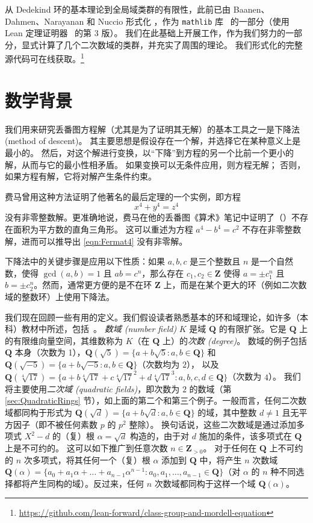\documentclass[sigplan,10pt,nonacm,
screen]{acmart} \settopmatter{printfolios=true,printccs=false,printacmref=false}
\newcommand{\mathlib}{\lstinline{mathlib}\xspace}
\newcommand{\QQ}{\mathbf{Q}}
\newcommand{\ZZ}{\mathbf{Z}}
\begin{document}
从 Dedekind 环的基本理论到全局域类群的有限性，此前已由 Baanen、Dahmen、Narayanan 和 Nuccio 形式化 \cite{baanen_formalization_2021}，作为 \mathlib 库~\cite{mathlib} 的一部分（使用 Lean 定理证明器~\cite{lean-prover} 的第 3 版）。
我们在此基础上开展工作，作为我们努力的一部分，显式计算了几个二次数域的类群，并充实了周围的理论。
我们形式化的完整源代码可在线获取。\footnote{\url{https://github.com/lean-forward/class-group-and-mordell-equation}}

\section{数学背景}\label{sec:Background}

我们用来研究丢番图方程解（尤其是为了证明其无解）的基本工具之一是下降法 (method of descent)。
其主要思想是假设存在一个解，并选择它在某种意义上是最小的。
然后，对这个解进行变换，以“下降”到方程的另一个比前一个更小的解，从而与它的最小性相矛盾。
如果变换可以无条件应用，则方程无解；
否则，如果方程有解，它将对解产生条件约束。

费马曾用这种方法证明了他著名的最后定理的一个实例，即方程
\begin{equation}\label{eqn:Fermat4}
 x^4+y^4=z^4
 \end{equation}
 没有非零整数解。更准确地说，费马在他的丢番图《算术》笔记中证明了（\cite[第 1.6 节]{edwards-fermat}）不存在面积为平方数的直角三角形。
 这可以重述为方程 $ a^4-b^4=c^2 $ 不存在非零整数解，进而可以推导出 \eqref{eqn:Fermat4} 没有非零解。

下降法中的关键步骤是应用以下性质：如果 $a,b,c$ 是三个整数且 $n$ 是一个自然数，使得 $\gcd(a,b)=1$ 且 $ab=c^n$，那么存在 $c_1,c_2 \in \ZZ$ 使得 $a=\pm c_1^n$ 且 $b=\pm c_2^n$。然而，通常更方便的是不在环 $\ZZ$ 上，而是在某个更大的环（例如二次数域的整数环）上使用下降法。

我们现在回顾一些有用的定义。我们假设读者熟悉基本的环和域理论，如许多（本科）教材中所述，包括~\cite{lang2005undergraduate, DummitFoote2004}。
\emph{数域 (number field)} $K$ 是域 $\QQ$ 的有限扩张。它是 $\QQ$ 上的有限维向量空间，其维数称为 $K$（在 $\QQ$ 上）的\emph{次数 (degree)}。
数域的例子包括 $\QQ$ 本身（次数为 1），$\QQ(\sqrt{5})=\{a+b\sqrt{5} : a,b \in \QQ\}$ 和 $\QQ(\sqrt{-5})=\{a+b \sqrt{-5} : a,b \in \QQ\}$（次数均为 $2$），
以及 $\QQ(\sqrt[4]{17})=\{a+b\sqrt[4]{17}+c \sqrt[4]{17}^2 + d \sqrt[4]{17}^3 : a,b,c,d \in \QQ\}$（次数为 $4$）。
我们将主要使用\emph{二次域 (quadratic fields)}，即次数为 $2$ 的数域（第 \ref{sec:QuadraticRings} 节），如上面的第二个和第三个例子。一般而言，任何二次数域都同构于形式为 $\QQ(\sqrt{d})=\{a+b\sqrt{d} : a, b \in \QQ\}$ 的域，其中整数 $d\not=1$ 且无平方因子（即不被任何素数 $p$ 的 $p^2$ 整除）。
换句话说，这些二次数域是通过添加多项式 $X^2-d$ 的（复）根 $\alpha=\sqrt{d}$ 构造的，由于对 $d$ 施加的条件，该多项式在 $\QQ$ 上是不可约的。
这可以如下推广到任意次数 $n \in \ZZ_{>0}$。
对于任何在 $\QQ$ 上不可约的 $n$ 次多项式，将其任何一个（复）根 $\alpha$ 添加到 $\QQ$ 中，将产生 $n$ 次数域 $\QQ(\alpha)=\{a_0+a_1 \alpha + \ldots + a_{n-1} \alpha^{n-1} : a_0, a_1, \ldots, a_{n-1} \in \QQ\}$（对 $\alpha$ 的 $n$ 种不同选择都将产生同构的域）。反过来，任何 $n$ 次数域都同构于这样一个域 $\QQ(\alpha)$。
\end{document}
